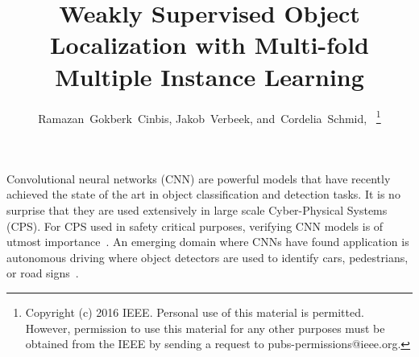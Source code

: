 \documentclass[10pt,journal,cspaper,final,twocolumn,compsoc]{./IEEEtran}
\begin{document}
\title{Weakly Supervised Object Localization with Multi-fold Multiple Instance Learning}

\author{Ramazan~Gokberk~Cinbis, %
        Jakob~Verbeek, %
        and~Cordelia~Schmid,~%
\thanks{Copyright (c) 2016 IEEE. Personal use of this material is permitted. However, permission to use this material for any other purposes must be obtained from the IEEE by sending a request to pubs-permissions@ieee.org.}}





\maketitle
\IEEEdisplaynontitleabstractindextext


Convolutional neural networks (CNN) are powerful models that
have recently achieved the state of the art in object classification and detection tasks. It is no surprise that they are used extensively in large scale Cyber-Physical Systems (CPS). For CPS used in safety critical purposes, verifying CNN models is of utmost importance~\cite{dreossi2017compositional}.
An emerging domain where CNNs have found application is autonomous driving where
object detectors are used to identify cars, pedestrians, or road signs~\cite{dougherty1995review, BojarskiTDFFGJM16}.
\end{document}
